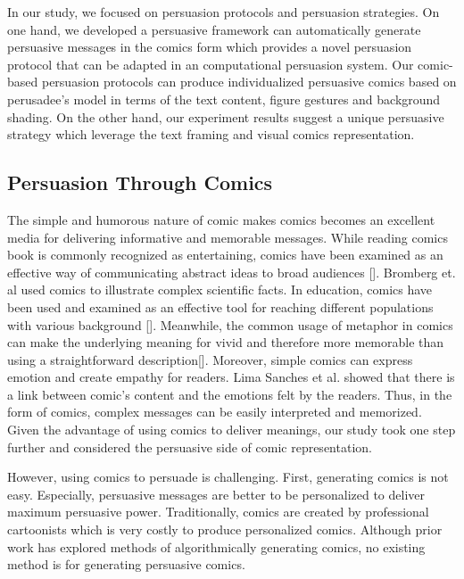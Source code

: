 In our study, we focused on persuasion protocols and persuasion strategies. On one hand, we developed a persuasive framework can automatically generate persuasive messages in the comics form which provides a novel persuasion protocol that can be adapted in an computational persuasion system. Our comic-based persuasion protocols can produce individualized persuasive comics based on perusadee's model in terms of the text content, figure gestures and background shading. On the other hand, our experiment results suggest a unique persuasive strategy which leverage the text framing and visual comics representation. \par

\subsection{Persuasion Through Comics}
The simple and humorous nature of comic makes comics becomes an excellent media for delivering informative and memorable messages. While reading comics book is commonly recognized as entertaining, comics have been examined as an effective way of communicating abstract ideas to broad audiences []. Bromberg et. al used comics to illustrate complex scientific facts. In education, comics have been used and examined as an effective tool for reaching different populations with various background []. Meanwhile, the common usage of metaphor in comics can make the underlying meaning for vivid and therefore more memorable than using a straightforward description[]. Moreover, simple comics can express emotion and create empathy for readers. Lima Sanches et al. showed that there is a link between comic's content and the emotions felt by the readers. Thus, in the form of comics, complex messages can be easily interpreted and memorized. Given the advantage of using comics to deliver meanings, our study took one step further and considered the persuasive side of comic representation. \par
However, using comics to persuade is challenging. First, generating comics is not easy. Especially, persuasive messages are better to be personalized to deliver maximum persuasive power. Traditionally, comics are created by professional cartoonists which is very costly to produce personalized comics.  Although prior work has explored methods of algorithmically generating comics, no existing method is for generating persuasive comics. \par
